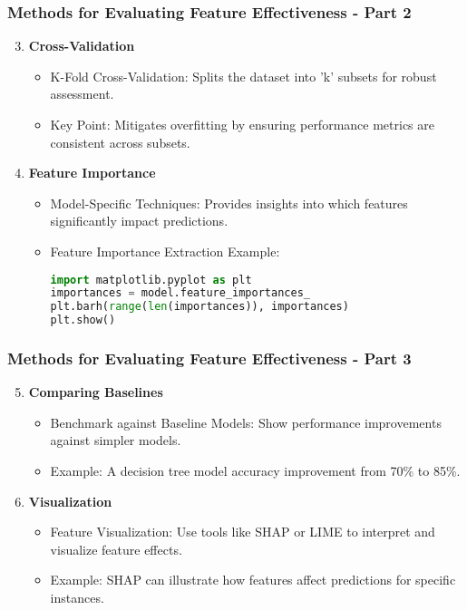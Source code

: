\documentclass[aspectratio=169]{beamer}
\begin{document}
\begin{frame}[fragile]
    \frametitle{Methods for Evaluating Feature Effectiveness - Part 2}
    
    \begin{enumerate}
        \setcounter{enumi}{2}
        \item \textbf{Cross-Validation}
        \begin{itemize}
            \item K-Fold Cross-Validation: Splits the dataset into 'k' subsets for robust assessment.
            \item Key Point: Mitigates overfitting by ensuring performance metrics are consistent across subsets.
        \end{itemize}
        
        \item \textbf{Feature Importance}
        \begin{itemize}
            \item Model-Specific Techniques: Provides insights into which features significantly impact predictions.
            \item Feature Importance Extraction Example:
            \begin{lstlisting}[language=Python]
import matplotlib.pyplot as plt
importances = model.feature_importances_
plt.barh(range(len(importances)), importances)
plt.show()
            \end{lstlisting}
        \end{itemize}
    \end{enumerate}
\end{frame}

\begin{frame}[fragile]
    \frametitle{Methods for Evaluating Feature Effectiveness - Part 3}
    
    \begin{enumerate}
        \setcounter{enumi}{4}
        \item \textbf{Comparing Baselines}
        \begin{itemize}
            \item Benchmark against Baseline Models: Show performance improvements against simpler models.
            \item Example: A decision tree model accuracy improvement from 70\% to 85\%.
        \end{itemize}
        
        \item \textbf{Visualization}
        \begin{itemize}
            \item Feature Visualization: Use tools like SHAP or LIME to interpret and visualize feature effects.
            \item Example: SHAP can illustrate how features affect predictions for specific instances.
        \end{itemize}
    \end{enumerate}
\end{frame}
\end{document}

